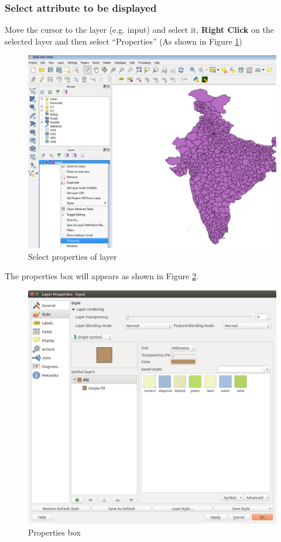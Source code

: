\documentclass[12pt,oneside]{memoir}
\begin{document}
\subsubsection{Select attribute to be displayed}
Move the cursor to the layer (e.g. input) and select it, \textbf{Right Click} on the selected layer and then select ``Properties'' (As shown in Figure \ref{outputattributeselect})
\begin{figure}[H]
\centering
\includegraphics[scale=0.4]{outputattributeselect} 
\caption{Select properties of layer} 
\label{outputattributeselect}
\end{figure}

The properties box will appears as shown in Figure \ref{propertybox}.

\begin{figure}[H]
\centering
\includegraphics[scale=0.3]{propertybox} 
\caption{Properties box} 
\label{propertybox}
\end{figure}
\end{document}
